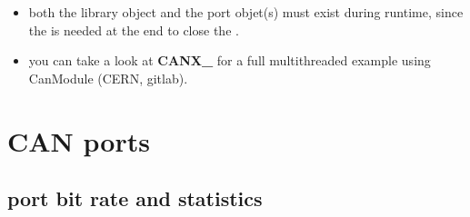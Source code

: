 \documentclass[a4paper,10pt,english]{sphinxmanual}
\begin{document}
\begin{sphinxVerbatim}[commandchars=\\\{\}]
\end{sphinxVerbatim}
\begin{itemize}
\item {} 
\sphinxAtStartPar
both the library object  and the port objet(s)  must exist during runtime, since the 
is needed at the end to close the  .

\item {} 
\sphinxAtStartPar
you can take a look at {\color{red}\bfseries{}\textasciigrave{}CANX\textasciigrave{}\_} for a full multithreaded example using CanModule (CERN, gitlab).

\end{itemize}


\chapter{CAN ports}
\label{\detokenize{canports:can-ports}}\label{\detokenize{canports::doc}}

\section{port bit rate and statistics}
\label{\detokenize{canports:port-bit-rate-and-statistics}}
\end{document}
